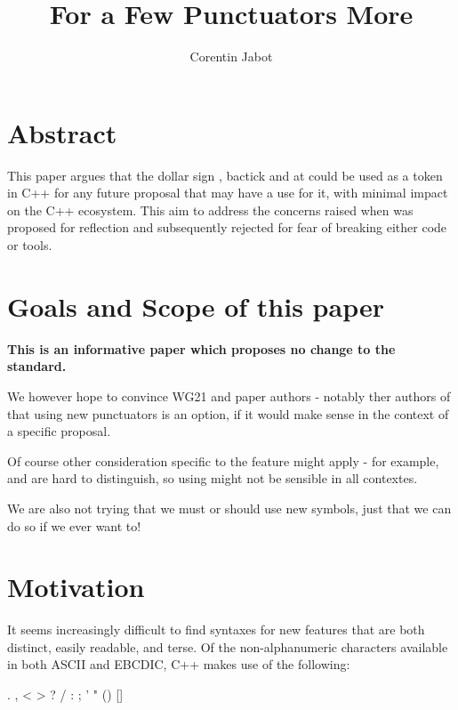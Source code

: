 \documentclass{wg21}
\title{For a Few Punctuators More}
\author{Corentin Jabot}{corentin.jabot@gmail.com}
\begin{document}
    \maketitle
    
    \section{Abstract}
    
    This paper argues that the dollar sign \tcode{\$}, bactick \tcode{\textasciigrave} and at \tcode{\atsign} could be used as a token in C++ for any future proposal that may have a use for it,
    with minimal impact on the C++ ecosystem.
    This aim to address the concerns raised when \tcode{\$} was proposed for reflection and subsequently rejected for fear of breaking either code or tools.
    
    \section{Goals and Scope of this paper}
    
    \textbf{This is an informative paper which proposes no change to the standard.}
    
    We however hope to convince WG21 and paper authors - notably ther authors of  that using new punctuators is an option, if it would make sense in the
    context of a specific proposal.
    
    Of course other consideration specific to the feature might apply - for example, \tcode{\textasciigrave} and  are hard to distinguish, so  using \tcode{\textasciigrave}
    might not be sensible in all contextes.
    
    We are also not trying that we must or should use new symbols, just that we can do so if we ever want to!
    
    
    \section{Motivation}
    
    It seems increasingly difficult to find syntaxes for new features that are both distinct, easily readable, and terse.
    Of the non-alphanumeric characters available in both ASCII and EBCDIC, C++ makes use of the following:
    \begin{codeblock}
        . , < > ? / : ; ' " () {} [] %
    \end{codeblock}
    
\end{document}
